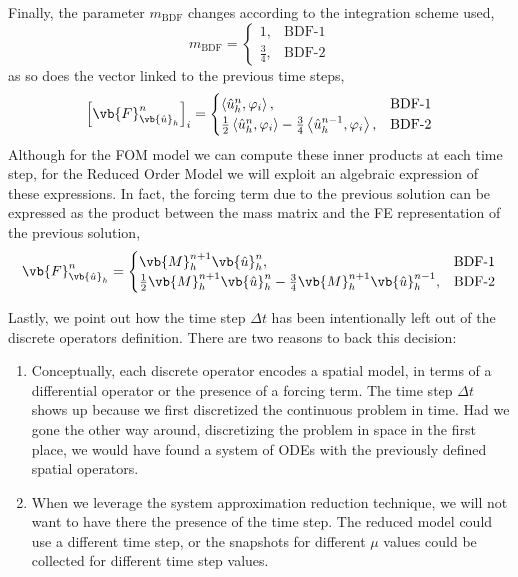 \documentclass[../../main.tex]{subfiles}
\newcommand{\inner}[2]{\left<#1, #2\right>}
\begin{document}
Finally, the parameter $m_{\text{BDF}}$ changes according to the integration scheme used,
\begin{equation}
    m_{\text{BDF}} = 
    \begin{cases}
    1, &\text{BDF-1} \\    
    \frac{3}{4}, &\text{BDF-2}    
    \end{cases}
\end{equation}
as so does the vector linked to the previous time steps, 
\begin{equation}
    \left[\vb{F}_{\vb{\hat{u}}_h}^{n}\right]_{i} = 
    \begin{cases}
        \inner{\hat{u}_h^{n}}{\varphi_i}, &\text{BDF-1} \\
        \frac{1}{2}\inner{\hat{u}_h^{n}}{\varphi_i}
        - \frac{3}{4}\inner{\hat{u}_h^{n-1}}{\varphi_i}, &\text{BDF-2}
    \end{cases}
\end{equation}
Although for the FOM model we can compute these inner products at each time step, for the Reduced Order Model we will exploit an algebraic expression of these expressions.
In fact, the forcing term due to the previous solution can be expressed as the product between the mass matrix and the FE representation of the previous solution, 
\begin{equation}
    \label{eq:1d_fom_forcing_term_time_mass_matrix}
    \vb{F}_{\vb{\hat{u}}_h}^{n}= 
    \begin{cases}
        \vb{M}_{h}^{n+1} \vb{\hat{u}}_{h}^{n}, &\text{BDF-1} \\
        \frac{1}{2}\vb{M}_{h}^{n+1} \vb{\hat{u}}_{h}^{n}
        - \frac{3}{4}\vb{M}_{h}^{n+1} \vb{\hat{u}}_{h}^{n-1}, &\text{BDF-2}
    \end{cases}
\end{equation}

Lastly, we point out how the time step $\Delta t$ has been intentionally left out of the discrete operators definition.
There are two reasons to back this decision:
\begin{enumerate}
    \item Conceptually, each discrete operator encodes a spatial model, in terms of a differential operator or the presence of a forcing term.
    The time step $\Delta t$ shows up because we first discretized the continuous problem in time. 
    Had we gone the other way around, discretizing the problem in space in the first place, we would have found a system of ODEs with the previously defined spatial operators. 
    \item When we leverage the system approximation reduction technique, we will not want to have there the presence of the time step.
    The reduced model could use a different time step, or the snapshots for different $\mu$ values could be collected for different time step values.
\end{enumerate} 
\end{document}
